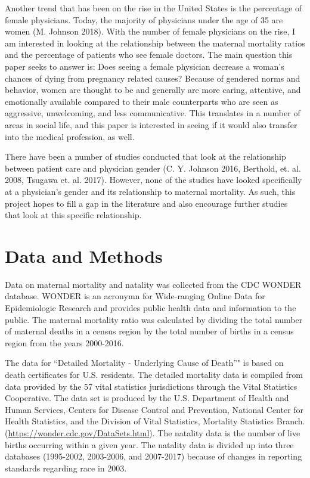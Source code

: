 \documentclass[11pt,]{article}
\begin{document}
Another trend that has been on the rise in the United States is the
percentage of female physicians. Today, the majority of physicians under
the age of 35 are women (M. Johnson 2018). With the number of female
physicians on the rise, I am interested in looking at the relationship
between the maternal mortality ratios and the percentage of patients who
see female doctors. The main question this paper seeks to answer is:
Does seeing a female physician decrease a woman's chances of dying from
pregnancy related causes? Because of gendered norms and behavior, women
are thought to be and generally are more caring, attentive, and
emotionally available compared to their male counterparts who are seen
as aggressive, unwelcoming, and less communicative. This translates in a
number of areas in social life, and this paper is interested in seeing
if it would also transfer into the medical profession, as well.

There have been a number of studies conducted that look at the
relationship between patient care and physician gender (C. Y. Johnson
2016, Berthold, et. al. 2008, Tsugawa et. al. 2017). However, none of
the studies have looked specifically at a physician's gender and its
relationship to maternal mortality. As such, this project hopes to fill
a gap in the literature and also encourage further studies that look at
this specific relationship.

\section{Data and Methods}\label{data-and-methods}

Data on maternal mortality and natality was collected from the CDC
WONDER database. WONDER is an acronymn for Wide-ranging Online Data for
Epidemiologic Research and provides public health data and information
to the public. The maternal mortality ratio was calculated by dividing
the total number of maternal deaths in a census region by the total
number of births in a census region from the years 2000-2016.

The data for ``Detailed Mortality - Underlying Cause of Death''" is
based on death certificates for U.S. residents. The detailed mortality
data is compiled from data provided by the 57 vital statistics
jurisdictions through the Vital Statistics Cooperative. The data set is
produced by the U.S. Department of Health and Human Services, Centers
for Disease Control and Prevention, National Center for Health
Statistics, and the Division of Vital Statistics, Mortality Statistics
Branch. (\url{https://wonder.cdc.gov/DataSets.html}). The natality data
is the number of live births occurring within a given year. The natality
data is divided up into three databases (1995-2002, 2003-2006, and
2007-2017) because of changes in reporting standards regarding race in
2003.
\end{document}
